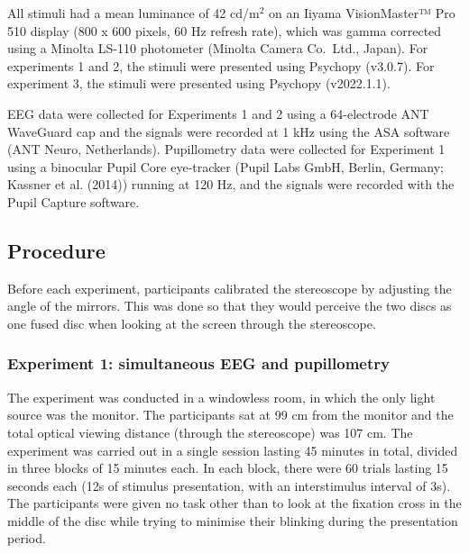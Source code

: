 \documentclass[
]{article}
\begin{document}
All stimuli had a mean luminance of 42 cd/m\(^2\) on an Iiyama VisionMaster™ Pro 510 display (800 x 600 pixels, 60 Hz refresh rate), which was gamma corrected using a Minolta LS-110 photometer (Minolta Camera Co.~Ltd., Japan). For experiments 1 and 2, the stimuli were presented using Psychopy (v3.0.7). For experiment 3, the stimuli were presented using Psychopy (v2022.1.1).

EEG data were collected for Experiments 1 and 2 using a 64-electrode ANT WaveGuard cap and the signals were recorded at 1 kHz using the ASA software (ANT Neuro, Netherlands). Pupillometry data were collected for Experiment 1 using a binocular Pupil Core eye-tracker (Pupil Labs GmbH, Berlin, Germany; Kassner et al. (2014)) running at 120 Hz, and the signals were recorded with the Pupil Capture software.

\hypertarget{procedure}{%
\subsection{Procedure}\label{procedure}}

Before each experiment, participants calibrated the stereoscope by adjusting the angle of the mirrors. This was done so that they would perceive the two discs as one fused disc when looking at the screen through the stereoscope.

\hypertarget{experiment-1-simultaneous-eeg-and-pupillometry}{%
\subsubsection{Experiment 1: simultaneous EEG and pupillometry}\label{experiment-1-simultaneous-eeg-and-pupillometry}}

The experiment was conducted in a windowless room, in which the only light source was the monitor. The participants sat at 99 cm from the monitor and the total optical viewing distance (through the stereoscope) was 107 cm. The experiment was carried out in a single session lasting 45 minutes in total, divided in three blocks of 15 minutes each. In each block, there were 60 trials lasting 15 seconds each (12s of stimulus presentation, with an interstimulus interval of 3s). The participants were given no task other than to look at the fixation cross in the middle of the disc while trying to minimise their blinking during the presentation period.
\end{document}

